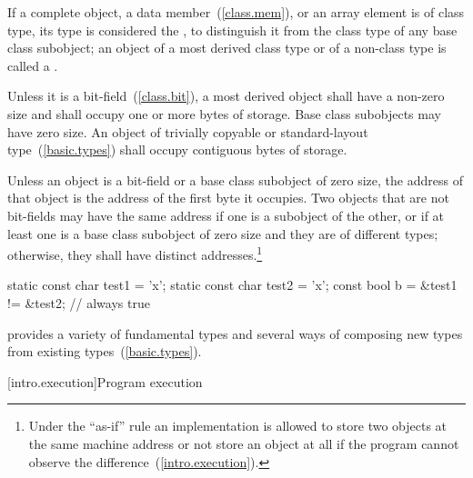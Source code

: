 \pnum
If a complete object, a data member~(\ref{class.mem}), or an array element is of
class type, its type is considered the , to distinguish it from the class type of any base class subobject;
an object of a most derived class type or of a non-class type is called a
.

\pnum
{}%
Unless it is a bit-field~(\ref{class.bit}), a most derived object shall have a
non-zero size and shall occupy one or more bytes of storage. Base class
subobjects may have zero size. An object of trivially copyable or
standard-layout type~(\ref{basic.types}) shall occupy contiguous bytes of
storage.

\pnum
{}%
%
Unless an object is a bit-field or a base class subobject of zero size, the
address of that object is the address of the first byte it occupies. Two
objects that are not bit-fields
may have the same address if one is a subobject of the other, or if at least
one is a base class subobject of zero size and they are of different types;
otherwise, they shall have distinct addresses.\footnote{Under the ``as-if'' rule an
implementation is allowed to store two objects at the same machine address or
not store an object at all if the program cannot observe the
difference~(\ref{intro.execution}).}

\begin{example}
\begin{codeblock}
static const char test1 = 'x';
static const char test2 = 'x';
const bool b = &test1 != &test2;      // always true
\end{codeblock}
\end{example}

\pnum
\begin{note} 
\Cpp  provides a variety of fundamental types and several ways of composing
new types from existing types~(\ref{basic.types}).
\end{note}%

[intro.execution]{Program execution}


